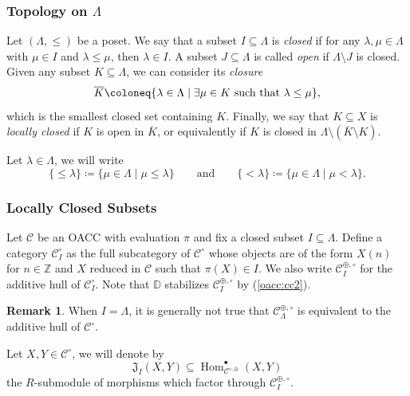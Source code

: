 \documentclass{amsart}
\newcommand{\Z}{\mathbb{Z}}
\newcommand{\scrC}{\mathcal{C}}
\DeclareMathOperator{\Hom}{Hom}
\newcommand{\DD}{\mathbb{D}}
\theoremstyle{definition}
\newtheorem{remark}[subsubsection]{Remark}
\numberwithin{equation}{subsection}
\begin{document}
\subsubsection{Topology on \texorpdfstring{$\Lambda$}{Lambda}}

Let $(\Lambda, \leq)$ be a poset. We say that a subset $I \subseteq \Lambda$ is \emph{closed} if for any $\lambda,\mu \in \Lambda$ with $\mu \in I$ and $\lambda \leq \mu$, then $\lambda \in I$.
A subset $J \subseteq \Lambda$ is called \emph{open} if $\Lambda \setminus J$ is closed. Given any subset $K \subseteq \Lambda$, we can consider its \emph{closure}
\[\overline{K} \coloneq \{ \lambda \in \Lambda \mid \exists \mu \in K \textnormal{ such that } \lambda \leq \mu \},\]
which is the smallest closed set containing $K$.
Finally, we say that $K \subseteq X$ is \emph{locally closed} if $K$ is open in $\overline{K}$, or equivalently if $K$ is closed in $\Lambda \setminus (\overline{K} \setminus K)$.

Let $\lambda \in \Lambda$, we will write 
\[\{\leq \lambda\} \coloneq \{ \mu \in \Lambda \mid \mu \leq \lambda \} \qquad\text{and}\qquad \{< \lambda\} \coloneq \{ \mu \in \Lambda \mid \mu < \lambda \}.\]

\subsubsection{Locally Closed Subsets}

Let $\scrC$ be an OACC with evaluation $\pi$ and fix a closed subset $I \subseteq \Lambda$.
Define a category $\scrC_I^{\circ}$ as the full subcategory of $\scrC^{\circ}$ whose objects are of the form $X (n)$ for $n \in \Z$ and $X$ reduced in $\scrC$ such that $\pi (X) \in I$.
We also write $\scrC_{I}^{\oplus, \circ}$ for the additive hull of $\scrC_I^{\circ}$. Note that  $\DD$ stabilizes $\scrC_{I}^{\oplus, \circ}$ by (\ref{oacc:cc2}).

\begin{remark}\label{rem:failure_of_additive_generation}
    When $I = \Lambda$, it is generally not true that $\scrC_{\Lambda}^{\oplus, \circ}$ is equivalent to the additive hull of $\scrC^{\circ}$.
\end{remark}

Let $X, Y \in \scrC^{\circ}$, we will denote by
\[\mathfrak{J}_{I} (X,Y) \subseteq \Hom_{\scrC^{\circ, \oplus}}^{\bullet} (X,Y)\]
the $R$-submodule of morphisms which factor through $\scrC_{I}^{\oplus, \circ}$.
\end{document}

